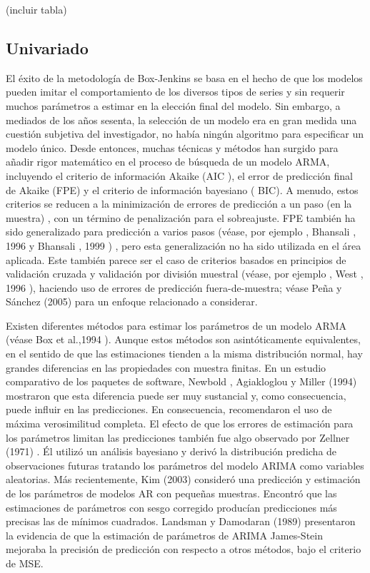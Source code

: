 \documentclass{llncs}
\begin{document}
(incluir tabla)

\subsection{Univariado}

El éxito de la metodología de Box-Jenkins se basa en el hecho de que los modelos pueden imitar el comportamiento de los diversos tipos de series y sin requerir muchos parámetros a estimar en la elección final del modelo. Sin embargo, a mediados de los años sesenta, la selección de un modelo era en gran medida una cuestión subjetiva del investigador, no había ningún algoritmo para especificar un modelo único. Desde entonces, muchas técnicas y métodos han surgido para añadir rigor matemático en el proceso de búsqueda de un modelo ARMA, incluyendo el criterio de información Akaike (AIC ), el error de predicción final de Akaike (FPE) y el criterio de información bayesiano ( BIC). A menudo, estos criterios se reducen a la minimización de errores de predicción a un paso (en la muestra) , con un término de penalización para el sobreajuste. FPE también ha sido generalizado para predicción a varios pasos (véase, por ejemplo , Bhansali , 1996 \cite{Bhansali1996577} y Bhansali , 1999 \cite{Bhansali1999295}) , pero esta generalización no ha sido utilizada en el área aplicada. Este también parece ser el caso de criterios basados en principios de validación cruzada y validación por división muestral (véase, por ejemplo , West , 1996 \cite{West19961084}), haciendo uso de errores de predicción fuera-de-muestra; véase Peña y Sánchez (2005) \cite{Pena2005135} para un enfoque relacionado a considerar.

Existen diferentes métodos para estimar los parámetros de un modelo ARMA (véase Box et al.,1994 \cite{Box1994}). Aunque estos métodos son asintóticamente equivalentes, en el sentido de que las estimaciones tienden a la misma distribución normal, hay grandes diferencias en las propiedades con muestra finitas. En un estudio comparativo de los paquetes de software, Newbold , Agiakloglou y Miller (1994)  \cite{Newbold1994573}mostraron que esta diferencia puede ser muy sustancial y, como consecuencia, puede influir en las predicciones. En consecuencia, recomendaron el uso de máxima verosimilitud completa. El efecto de que los errores de estimación para los parámetros limitan las predicciones también fue algo observado por Zellner (1971) \cite{Zellner1971}. Él utilizó un análisis bayesiano y derivó la distribución predicha de observaciones futuras tratando los parámetros del modelo ARIMA como variables aleatorias. Más recientemente,  Kim (2003) \cite{Kim2003493} consideró una predicción y estimación de los parámetros de modelos AR con pequeñas muestras. Encontró que las estimaciones de parámetros con sesgo corregido producían predicciones más precisas las de mínimos cuadrados. Landsman y Damodaran (1989) \cite{Landsman1989491} presentaron la evidencia de que la estimación de parámetros de ARIMA James-Stein mejoraba la precisión de predicción con respecto a otros métodos, bajo el criterio de MSE.
\end{document}
